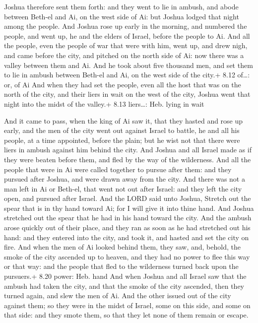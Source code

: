  Joshua therefore sent them forth: and they went to lie in
ambush, and abode between Beth-el and Ai, on the west side of Ai: but
Joshua lodged that night among the people.  And Joshua rose
up early in the morning, and numbered the people, and went up, he and
the elders of Israel, before the people to Ai.  And all the
people, even the people of war that were with him, went up, and drew
nigh, and came before the city, and pitched on the north side of Ai: now
there was a valley between them and Ai.  And he took about
five thousand men, and set them to lie in ambush between Beth-el and Ai,
on the west side of the city.+ 8.12 of\ldots: or, of Ai 
And when they had set the people, even all the host that was on the
north of the city, and their liers in wait on the west of the city,
Joshua went that night into the midst of the valley.+ 8.13 liers\ldots:
Heb. lying in wait

 And it came to pass, when the king of Ai saw it, that
they hasted and rose up early, and the men of the city went out against
Israel to battle, he and all his people, at a time appointed, before the
plain; but he wist not that there were liers in ambush against him
behind the city.  And Joshua and all Israel made as if they
were beaten before them, and fled by the way of the wilderness.
 And all the people that were in Ai were called together to
pursue after them: and they pursued after Joshua, and were drawn away
from the city.  And there was not a man left in Ai or
Beth-el, that went not out after Israel: and they left the city open,
and pursued after Israel.  And the LORD said unto Joshua,
Stretch out the spear that is in thy hand toward Ai; for I will give it
into thine hand. And Joshua stretched out the spear that he had in his
hand toward the city.  And the ambush arose quickly out of
their place, and they ran as soon as he had stretched out his hand: and
they entered into the city, and took it, and hasted and set the city on
fire.  And when the men of Ai looked behind them, they saw,
and, behold, the smoke of the city ascended up to heaven, and they had
no power to flee this way or that way: and the people that fled to the
wilderness turned back upon the pursuers.+ 8.20 power: Heb. hand
 And when Joshua and all Israel saw that the ambush had
taken the city, and that the smoke of the city ascended, then they
turned again, and slew the men of Ai.  And the other issued
out of the city against them; so they were in the midst of Israel, some
on this side, and some on that side: and they smote them, so that they
let none of them remain or escape.

